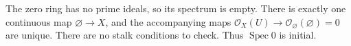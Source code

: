 The zero ring has no prime ideals, so its spectrum is empty. There is exactly one continuous map $\varnothing\to X$, and the accompanying maps $\mathcal O_X(U)\to\mathcal O_{\varnothing}(\varnothing)=0$ are unique. There are no stalk conditions to check. Thus $\operatorname{Spec}0$ is initial.

